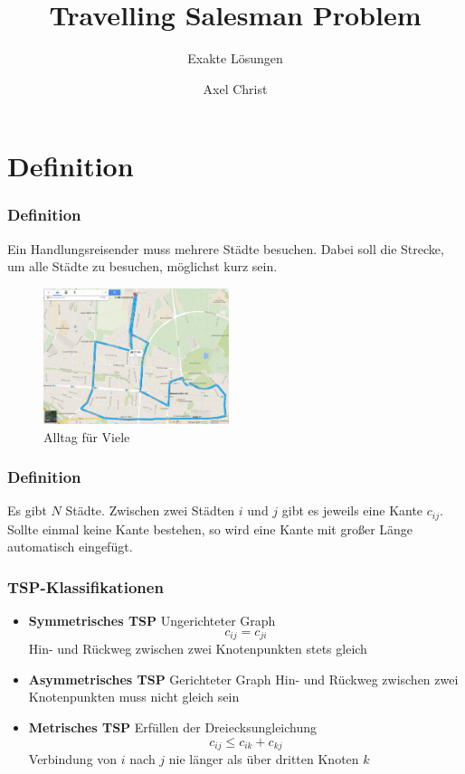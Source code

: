 \documentclass{beamer}
\title[TSP]
{Travelling Salesman Problem}
\subtitle{Exakte Lösungen}
\author
{Axel Christ}
\institute{DHBW Karlsruhe}
\begin{document}
  \frame{\titlepage}
  \section{Definition}
  \begin{frame}
    \frametitle{Definition}
    Ein Handlungsreisender muss mehrere Städte besuchen. Dabei soll die
    Strecke, um alle Städte zu besuchen, möglichst kurz sein.
    \pause
    \begin{figure}
      \centering
      \includegraphics[width=\linewidth,height=150px,keepaspectratio]{alltag.png}
      \caption{Alltag für Viele}
    \end{figure}
  \end{frame}

  \begin{frame}
    \frametitle{Definition}
    Es gibt $N$ Städte.
    Zwischen zwei Städten $i$ und $j$ gibt es jeweils eine Kante $c_{ij}$.
    Sollte einmal keine Kante bestehen, so wird eine Kante mit großer Länge
    automatisch eingefügt.
  \end{frame}

  \begin{frame}
    \frametitle{TSP-Klassifikationen}
    \begin{itemize}[<+->]
      \item \textbf{Symmetrisches TSP}
        \linebreak
        Ungerichteter Graph
        $$c_{ij} = c_{ji}$$
        Hin- und Rückweg zwischen zwei Knotenpunkten stets gleich
      \item \textbf{Asymmetrisches TSP}
        \linebreak
        Gerichteter Graph
        Hin- und Rückweg zwischen zwei Knotenpunkten muss nicht gleich sein
      \item \textbf{Metrisches TSP}
        \linebreak
        Erfüllen der Dreiecksungleichung
        $$c_{ij} \le c_{ik} + c_{kj}$$
        Verbindung von $i$ nach $j$ nie länger als über dritten Knoten $k$
    \end{itemize}
  \end{frame}
\end{document}
